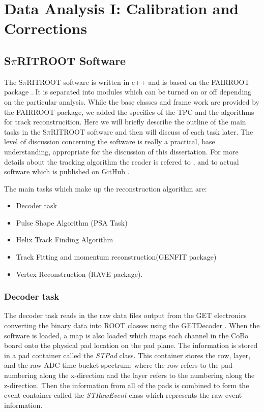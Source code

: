 \chapter{Data Analysis I: Calibration and Corrections}

\section{S$\pi$RITROOT Software}
\label{sec:software}

The S$\pi$RITROOT software is written in c++ and is based on the FAIRROOT package \cite{fairroot}. It is separated into modules which can be turned on or off depending on the particular analysis. While the base classes and frame work are provided by the FAIRROOT package, we added the specifics of the \spirit TPC and the algorithms for track reconstrucition. Here we will briefly describe the outline of the main tasks in the S$\pi$RITROOT software and then will discuss of each task later. The level of discussion concerning the software is really a practical, base understanding, appropriate for the discussion of this dissertation. For more details about the tracking algorithm the reader is refered to \cite{spiritroot_paper}, and to actual software which is published on GitHub \cite{spiritroot_git}. 

The main tasks which make up the reconstruction algorithm are:

\begin{itemize}
  \item Decoder task
  \item Pulse Shape Algorithm (PSA Task)
  \item Helix Track Finding Algorithm
  \item Track Fitting and momentum reconstruction(GENFIT package)
  \item Vertex Reconstruction (RAVE package).
\end{itemize}


\subsection{Decoder task}
The decoder task reads in the raw data files output from the GET electronics converting the binary data into \spirit ROOT classes using the GETDecoder \cite{getdecoder}. When the software is loaded, a map is also loaded which maps each channel in the CoBo board onto the physical pad location on the pad plane. The information is stored in a pad container called the \emph{STPad} class. This container stores the row, layer, and the raw ADC time bucket spectrum; where the row refers to the pad numbering along the x-direction and the layer refers to the numbering along the z-direction. Then the information from all of the pads is combined to form the event container called the \emph{STRawEvent} class which represents the raw event information. 

